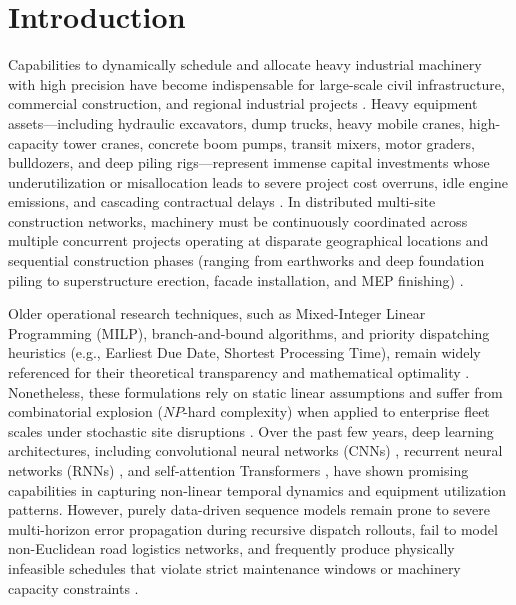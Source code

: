 \documentclass[pdflatex,sn-mathphys,Numbered]{sn-jnl}%
\begin{document}

\maketitle

\section{Introduction}\label{sec1}
Capabilities to dynamically schedule and allocate heavy industrial machinery with high precision have become indispensable for large-scale civil infrastructure, commercial construction, and regional industrial projects \cite{hossain2025,russo2025}. Heavy equipment assets---including hydraulic excavators, dump trucks, heavy mobile cranes, high-capacity tower cranes, concrete boom pumps, transit mixers, motor graders, bulldozers, and deep piling rigs---represent immense capital investments whose underutilization or misallocation leads to severe project cost overruns, idle engine emissions, and cascading contractual delays \cite{chiranjeevi2025,inam2024}. In distributed multi-site construction networks, machinery must be continuously coordinated across multiple concurrent projects operating at disparate geographical locations and sequential construction phases (ranging from earthworks and deep foundation piling to superstructure erection, facade installation, and MEP finishing) \cite{inam2025a,inam2025b}.

Older operational research techniques, such as Mixed-Integer Linear Programming (MILP), branch-and-bound algorithms, and priority dispatching heuristics (e.g., Earliest Due Date, Shortest Processing Time), remain widely referenced for their theoretical transparency and mathematical optimality \cite{hossain2025,meng2025}. Nonetheless, these formulations rely on static linear assumptions and suffer from combinatorial explosion ($NP$-hard complexity) when applied to enterprise fleet scales under stochastic site disruptions \cite{wang2025,ejiyi2025}. Over the past few years, deep learning architectures, including convolutional neural networks (CNNs) \cite{russo2025}, recurrent neural networks (RNNs) \cite{chiranjeevi2025}, and self-attention Transformers \cite{inam2025a}, have shown promising capabilities in capturing non-linear temporal dynamics and equipment utilization patterns. However, purely data-driven sequence models remain prone to severe multi-horizon error propagation during recursive dispatch rollouts, fail to model non-Euclidean road logistics networks, and frequently produce physically infeasible schedules that violate strict maintenance windows or machinery capacity constraints \cite{hong2024,park2024}.
\end{document}
